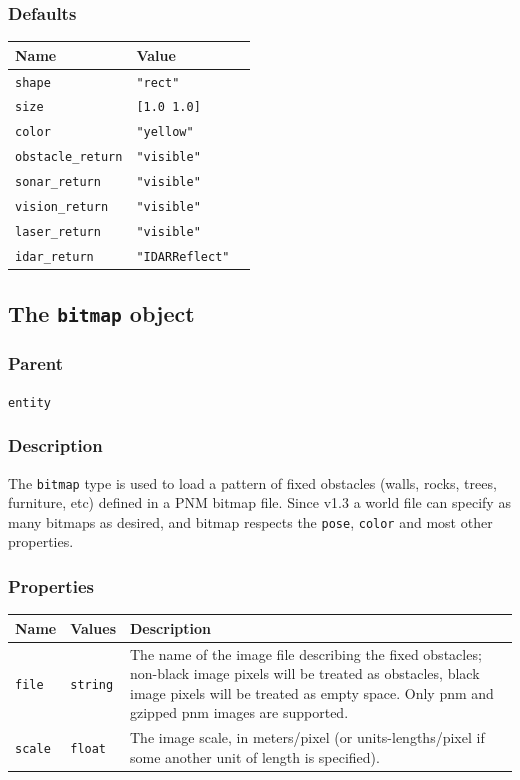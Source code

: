 \documentclass[11pt,twoside]{report}
\begin{document}
\subsubsection*{Defaults}
\begin{tabularx}{\columnwidth}{llX}
\hline
Name & Value\\
\hline
\verb'shape' & \verb'"rect"'\\
\verb'size' & \verb'[1.0 1.0]'\\
\verb'color' & \verb'"yellow"'\\
\verb'obstacle_return' & \verb'"visible"'\\
\verb'sonar_return' & \verb'"visible"'\\
\verb'vision_return' & \verb'"visible"'\\
\verb'laser_return' & \verb'"visible"'\\
\verb'idar_return' & \verb'"IDARReflect"'\\
\hline
\end{tabularx}

\newpage
\subsection{The {\tt bitmap} object}

\subsubsection*{Parent}
{\tt entity}

\subsubsection*{Description}
The \verb'bitmap' type is used to load a pattern of fixed obstacles
(walls, rocks, trees, furniture, etc) defined in a PNM bitmap
file. Since v1.3 a world file can specify as many bitmaps as desired,
and bitmap respects the \verb'pose', \verb'color' and most other
properties. 

\subsubsection*{Properties}
\begin{tabularx}{\columnwidth}{llX}
\hline
Name & Values & Description \\
\hline

\verb'file' & \verb'string' & The name of the image file
describing the fixed obstacles; non-black image pixels will be treated
as obstacles, black image pixels will be treated as empty space.  Only
pnm and gzipped pnm images are supported.\\

\verb'scale' & \verb'float' & The image scale, in meters/pixel (or
units-lengths/pixel if some another unit of length is specified).\\

\hline
\end{tabularx}
\end{document}
